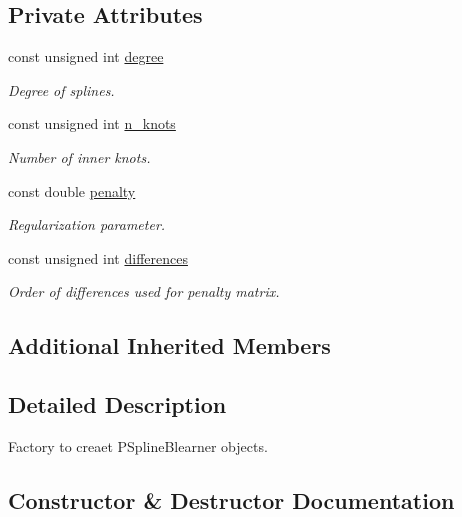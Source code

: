 \subsection*{Private Attributes}
\begin{DoxyCompactItemize}
\item 
const unsigned int \hyperlink{classblearnerfactory_1_1_p_spline_blearner_factory_a8cfdf9e919e6392b2cba293dd5d931d5}{degree}
\begin{DoxyCompactList}\small\item\em Degree of splines. \end{DoxyCompactList}\item 
const unsigned int \hyperlink{classblearnerfactory_1_1_p_spline_blearner_factory_aa2fbd861eba158d220ecf96ddd1b50c5}{n\+\_\+knots}
\begin{DoxyCompactList}\small\item\em Number of inner knots. \end{DoxyCompactList}\item 
const double \hyperlink{classblearnerfactory_1_1_p_spline_blearner_factory_ae5bfe83b154898ad6cff26d56a82f540}{penalty}
\begin{DoxyCompactList}\small\item\em Regularization parameter. \end{DoxyCompactList}\item 
const unsigned int \hyperlink{classblearnerfactory_1_1_p_spline_blearner_factory_ae309d500aebc2abea96a639e431a3fb3}{differences}
\begin{DoxyCompactList}\small\item\em Order of differences used for penalty matrix. \end{DoxyCompactList}\end{DoxyCompactItemize}
\subsection*{Additional Inherited Members}


\subsection{Detailed Description}
Factory to creaet {\ttfamily P\+Spline\+Blearner} objects. 

\subsection{Constructor \& Destructor Documentation}
\mbox{\label{classblearnerfactory_1_1_p_spline_blearner_factory_ac5218d98736f787d4a2cca8faf317470}} 
